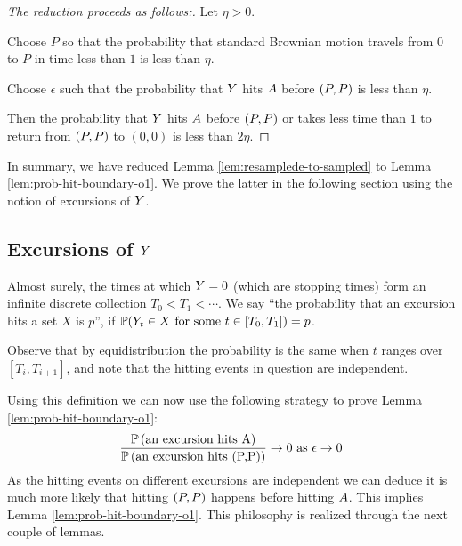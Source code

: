 {\begin{lemma}\label{lem:prob-hit-boundary-o1}
\end{lemma}

\newcommand{\origin}{(0,0)}

\begin{proof}[The reduction proceeds as follows:]

  Let $\eta > 0$.

  Choose $P$ so that the probability that standard Brownian motion
  travels from $0$ to $P$ in time less than $1$ is less than
  $\eta$.

  Choose $\epsilon$ such that the probability that $Y$ hits
  $A$ before $(P,P)$ is less than $\eta$.

  Then the probability that $Y$ hits $A$ before $(P,P)$
  or takes less time than $1$ to return from $(P,P)$ to $\origin$ is
  less than $2\eta$.

\end{proof}

In summary, we have reduced Lemma \ref{lem:resamplede-to-sampled} to
Lemma \ref{lem:prob-hit-boundary-o1}. We prove the latter in the
following section using the notion of excursions of $Y$.

\subsection{Excursions of $Y$}

\newcommand{\excursionstart}{T}
{
  Almost surely, the times at which $Y = 0$ (which are stopping
  times) form an infinite discrete collection $\excursionstart_0 <
  \excursionstart_1 < \cdots$. We say ``the probability that an excursion
  hits a set $X$ is $p$'', if $\P(\twodim_t\in X \text{
  for some } t\in [\excursionstart_0, \excursionstart_{1}]) = p$.

  Observe that by equidistribution the probability is the same when
  $t$ ranges over $[\excursionstart_i, \excursionstart_{i+1}]$, and
  note that the hitting events in question are independent.
}

\newcommand{\probexcursionhits}[1]{\P\left(\text{an excursion hits #1}\right)}

Using this definition we can now use the following strategy to
prove Lemma \ref{lem:prob-hit-boundary-o1}:
\[
\frac{\probexcursionhits{\boundarylines}}
     {\probexcursionhits{\farpoint}}
        \to 0 \text{ as } \epsilon\to0
\]
As the hitting events on different excursions are independent we
can deduce it is much more likely that hitting $(P,P)$ happens
before hitting $A$. This implies Lemma
\ref{lem:prob-hit-boundary-o1}. This philosophy is
realized through the next couple of lemmas.

}
